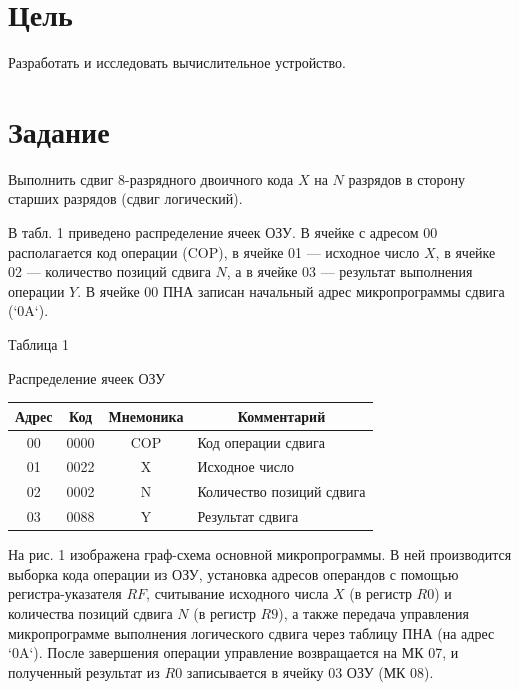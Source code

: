 \documentclass[oneside,a4paper,14pt]{extarticle}
\begin{document}
\newpage\thispagestyle{empty}
\newpage
\setcounter{page}{1}
\tableofcontents
\newpage

\section*{Цель}
Разработать и исследовать вычислительное устройство.

\section*{Задание}
Выполнить сдвиг 8-разрядного двоичного кода $X$ на $N$ разрядов в сторону старших разрядов (сдвиг логический).

В табл. 1 приведено распределение ячеек ОЗУ. В ячейке с адресом 00 располагается код операции (COP), в ячейке 01 — исходное число $X$, в ячейке 02 — количество позиций сдвига $N$, а в ячейке 03 — результат выполнения операции $Y$. В ячейке 00 ПНА записан начальный адрес микропрограммы сдвига (`0A`).

\begin{flushright}
	Таблица 1
\end{flushright}
\begin{center}
	Распределение ячеек ОЗУ
\end{center}
\begin{table}[H]
	\centering
	\begin{tabular}{|c|c|c|l|}
		\hline
		Адрес & Код  & Мнемоника & \multicolumn{1}{c|}{Комментарий} \\ \hline
		00    & 0000 & COP       & Код операции сдвига              \\ \hline
		01    & 0022 & X         & Исходное число                   \\ \hline
		02    & 0002 & N         & Количество позиций сдвига        \\ \hline
		03    & 0088 & Y         & Результат сдвига                 \\ \hline
	\end{tabular}
\end{table}

На рис. 1 изображена граф-схема основной микропрограммы. В ней производится выборка кода операции из ОЗУ, установка адресов операндов с помощью регистра-указателя $RF$, считывание исходного числа $X$ (в регистр $R0$) и количества позиций сдвига $N$ (в регистр $R9$), а также передача управления микропрограмме выполнения логического сдвига через таблицу ПНА (на адрес `0A`). После завершения операции управление возвращается на МК 07, и полученный результат из $R0$ записывается в ячейку 03 ОЗУ (МК 08).
\end{document}
